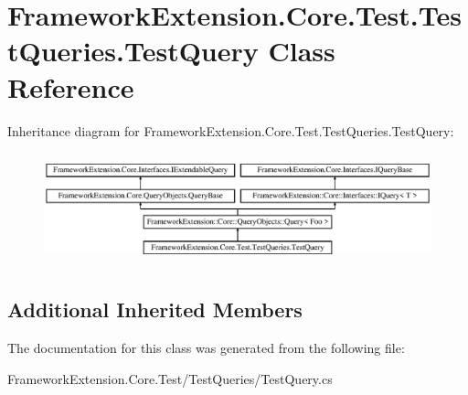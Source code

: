 \hypertarget{class_framework_extension_1_1_core_1_1_test_1_1_test_queries_1_1_test_query}{\section{Framework\-Extension.\-Core.\-Test.\-Test\-Queries.\-Test\-Query Class Reference}
\label{class_framework_extension_1_1_core_1_1_test_1_1_test_queries_1_1_test_query}
}
Inheritance diagram for Framework\-Extension.\-Core.\-Test.\-Test\-Queries.\-Test\-Query\-:\begin{figure}[H]
\begin{center}
\leavevmode
\includegraphics[height=3.255814cm]{class_framework_extension_1_1_core_1_1_test_1_1_test_queries_1_1_test_query}
\end{center}
\end{figure}
\subsection*{Additional Inherited Members}


The documentation for this class was generated from the following file\-:\begin{DoxyCompactItemize}
\item 
Framework\-Extension.\-Core.\-Test/\-Test\-Queries/Test\-Query.\-cs\end{DoxyCompactItemize}
